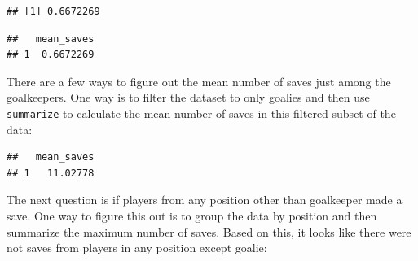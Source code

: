 \documentclass[]{book}
\makeatletter
\newenvironment{Shaded}{\begin{snugshade}}{\end{snugshade}}
\newcommand{\KeywordTok}[1]{\textcolor[rgb]{0.13,0.29,0.53}{\textbf{#1}}}
\newcommand{\DataTypeTok}[1]{\textcolor[rgb]{0.13,0.29,0.53}{#1}}
\newcommand{\StringTok}[1]{\textcolor[rgb]{0.31,0.60,0.02}{#1}}
\newcommand{\OperatorTok}[1]{\textcolor[rgb]{0.81,0.36,0.00}{\textbf{#1}}}
\newcommand{\NormalTok}[1]{#1}
\newenvironment{kframe}{%
\medskip{}
\setlength{\fboxsep}{.8em}
 \def\at@end@of@kframe{}%
 \ifinner\ifhmode%
  \def\at@end@of@kframe{\end{minipage}}%
  \begin{minipage}{\columnwidth}%
 \fi\fi%
 \def\FrameCommand##1{\hskip\@totalleftmargin \hskip-\fboxsep
 \colorbox{shadecolor}{##1}\hskip-\fboxsep
     \hskip-\linewidth \hskip-\@totalleftmargin \hskip\columnwidth}%
 \MakeFramed {\advance\hsize-\width
   \@totalleftmargin\z@ \linewidth\hsize
   \@setminipage}}%
 {\par\unskip\endMakeFramed%
 \at@end@of@kframe}
\renewenvironment{Shaded}{\begin{kframe}}{\end{kframe}}
\theoremstyle{definition}
\theoremstyle{definition}
\theoremstyle{definition}
\theoremstyle{remark}
\makeatother
\begin{document}
\begin{verbatim}
## [1] 0.6672269
\end{verbatim}

\begin{Shaded}
\end{Shaded}

\begin{verbatim}
##   mean_saves
## 1  0.6672269
\end{verbatim}

There are a few ways to figure out the mean number of saves just among
the goalkeepers. One way is to filter the dataset to only goalies and
then use \texttt{summarize} to calculate the mean number of saves in
this filtered subset of the data:

\begin{Shaded}
\end{Shaded}

\begin{verbatim}
##   mean_saves
## 1   11.02778
\end{verbatim}

The next question is if players from any position other than goalkeeper
made a save. One way to figure this out is to group the data by position
and then summarize the maximum number of saves. Based on this, it looks
like there were not saves from players in any position except goalie:

\begin{Shaded}
\end{Shaded}
\end{document}
